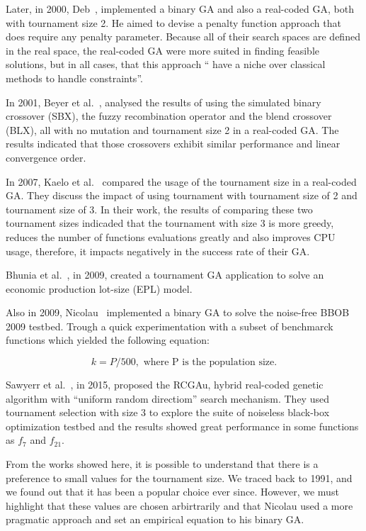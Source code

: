 Later, in 2000, Deb~\cite{deb2000efficient}, implemented a binary GA and also a real-coded GA, both with tournament size 2. He aimed to devise a penalty function approach that does require any penalty parameter. Because all of their search spaces are defined in the real space, the real-coded GA were more suited in finding feasible solutions, but in all cases, that this approach `` have a niche over classical methods to handle constraints''.


In 2001, Beyer et al.~\cite{beyer2001self}, analysed the results of using the simulated binary crossover (SBX), the fuzzy recombination operator and the blend crossover (BLX), all with no mutation and tournament size 2 in a real-coded GA. The results indicated that those crossovers exhibit similar performance and linear convergence order.


In 2007, Kaelo et al.~\cite{kaelo2007integrated} compared the usage of the tournament size in a real-coded GA. They discuss the impact of using tournament with tournament size of 2 and tournament size of 3. In their work, the results of comparing these two tournament sizes indicaded that the tournament with size 3 is more greedy, reduces the number of functions evaluations greatly and also improves CPU usage, therefore, it impacts negatively in the success rate of their GA.

Bhunia et al.~\cite{bhunia2009application}, in 2009, created a tournament GA application to solve an economic production lot-size (EPL) model. 

Also in 2009, Nicolau~\cite{nicolau2009application} implemented a binary GA to solve the noise-free BBOB 2009 testbed. Trough a quick experimentation with a subset of benchmarck functions which yielded the following equation:

\begin{equation}
	k = P/500, \text{ where P is the population size.}
\end{equation}


Sawyerr et al.~\cite{sawyerr2015benchmarking}, in 2015, proposed the RCGAu, hybrid real-coded genetic algorithm with ``uniform random directiom'' search mechanism. They used tournament selection with size 3 to explore the suite of noiseless black-box optimization testbed and the results showed great performance in some functions as $f_7$ and $f_{21}$.

From the works showed here, it is possible to understand that there is a preference to small values for the tournament size. We traced back to 1991, and we found out that it has been a popular choice ever since. However, we must highlight that these values are chosen arbirtrarily and that Nicolau used a more pragmatic approach and set an empirical equation to his binary GA. 




